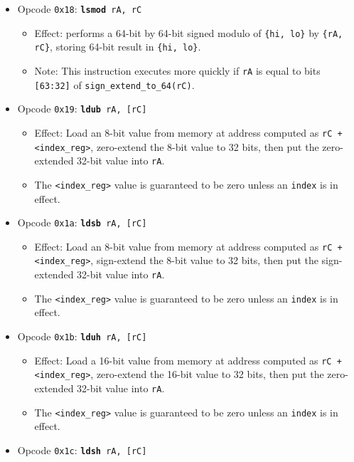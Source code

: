 \documentclass{article}
\begin{document}
\begin{itemize}
\begin{itemize}
		\end{itemize}
		\item Opcode \texttt{0x18}:
			\texttt{\textbf{lsmod} rA, rC}
		\begin{itemize}
			\item Effect:  performs a 64-bit by 64-bit signed modulo of
			\texttt{\{hi, lo\}} by \texttt{\{rA, rC\}}, storing 64-bit
			result in \texttt{\{hi, lo\}}.
			\item Note:  This instruction executes more quickly if
			\texttt{rA} is equal to bits \texttt{[63:32]} of
			\texttt{sign\_extend\_to\_64(rC)}.
		\end{itemize}
		\item Opcode \texttt{0x19}:
			\texttt{\textbf{ldub} rA, [rC]}
		\begin{itemize}
			\item Effect:  Load an 8-bit value from memory at address
			computed as \texttt{rC + <index\_reg>}, zero-extend
			the 8-bit value to 32 bits, then put the zero-extended 32-bit
			value into \texttt{rA}.
			\item The \texttt{<index\_reg>} value is guaranteed to be zero
			unless an \texttt{index} is in effect.
		\end{itemize}
		\item Opcode \texttt{0x1a}:
			\texttt{\textbf{ldsb} rA, [rC]}
		\begin{itemize}
			\item Effect:  Load an 8-bit value from memory at address
			computed as \texttt{rC + <index\_reg>}, sign-extend
			the 8-bit value to 32 bits, then put the sign-extended 32-bit
			value into \texttt{rA}.
			\item The \texttt{<index\_reg>} value is guaranteed to be zero
			unless an \texttt{index} is in effect.
		\end{itemize}
		\item Opcode \texttt{0x1b}:
			\texttt{\textbf{lduh} rA, [rC]}
		\begin{itemize}
			\item Effect:  Load a 16-bit value from memory at address
			computed as \texttt{rC + <index\_reg>}, zero-extend
			the 16-bit value to 32 bits, then put the zero-extended 32-bit
			value into \texttt{rA}.
			\item The \texttt{<index\_reg>} value is guaranteed to be zero
			unless an \texttt{index} is in effect.
		\end{itemize}
		\item Opcode \texttt{0x1c}:
			\texttt{\textbf{ldsh} rA, [rC]}

\end{itemize}
\end{document}
